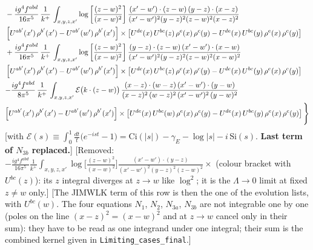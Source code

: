 \documentclass[9pt]{article}
\numberwithin{equation}{section}
\begin{document}
{\begin{align*}
& -\frac{ig^{4}f^{abd}}{16\pi^{5}}\,\frac{1}{k^{+}}\,\int_{x,y,z,x'}\log{\left[\frac{(z-w)^{2}}{(x-w)^{2}}\right]}\,
\frac{(x'-w')\cdot(z-w)\,(y-z)\cdot(x-z)}{(x'-w')^{2}(y-z)^{2}(z-w)^{2}(x-z)^{2}}\notag \\
&\left[U^{ab'}(x')\,\rho^{b'}(x')-U^{ab'}(w')\, \rho^{b'}(x')\right]\times \left[U^{de}(x)\,U^{bc}(z)\, \rho^{e}(x)\,\rho^{c}(y)-U^{de}(x)\,U^{bc}(y)\,\rho^{e}(x)\,\rho^{c}(y)\right] \notag \\
&+ \frac{ig^{4}f^{abd}}{16\pi^{5}}\,\frac{1}{k^{+}}\,\int_{x,y,z,x'}\log{\left[\frac{(z-w)^{2}}{(x-w)^{2}}\right]}\,
\frac{(y-z)\cdot(z-w)\,(x'-w')\cdot(x-w)}{(x'-w')^{2}(y-z)^{2}(z-w)^{2}(x-w)^{2}}\notag \\ 
& \left[U^{ab'}(x')\,\rho^{b'}(x')-U^{ab'}(w')\, \rho^{b'}(x')\right]\times \left[U^{de}(x)\,U^{bc}(z)\, \rho^{e}(x)\,\rho^{c}(y)-U^{de}(x)\,U^{bc}(y)\,\rho^{e}(x)\,\rho^{c}(y)\right]\notag \\ & {-\frac{ig^{4}f^{abd}}{8\pi^{5}}\,\frac{1}{k^{+}}\,\int_{x,y,z,x'}\mathcal{E}\big(k\cdot(z-w)\big)\,\frac{(x-z)\cdot(w-z)\,(x'-w')\cdot(y-w)}{(x-z)^{2}\,(w-z)^{2}\,(x'-w')^{2}\,(y-w)^{2}}}\notag \\ & {\left[U^{ab'}(x')\,\rho^{b'}(x')-U^{ab'}(w')\, \rho^{b'}(x')\right]\times \left[U^{de}(x)\,U^{bc}(w)\, \rho^{e}(x)\,\rho^{c}(y)-U^{de}(x)\,U^{bc}(y)\,\rho^{e}(x)\,\rho^{c}(y)\right]\Bigg\}}
\end{align*} {[with $\mathcal{E}(s)\equiv\int_{0}^{1}\frac{dt}{t}\big(e^{-ist}-1\big)=\mathrm{Ci}(|s|)-\gamma_{E}-\log|s|-i\,\mathrm{Si}(s)$. \textbf{Last term of $N_{3b}$ replaced.}]} {[Removed: $-\frac{ig^{4}f^{abd}}{16\pi^{5}}\frac{1}{k^{+}}\int_{x,y,z,x'}\log\big[\frac{(z-w)^{2}}{(x-w)^{2}}\big]\frac{(x'-w')\cdot(y-z)}{(x'-w')^{2}(y-z)^{2}(z-w)^{2}}\times$ (colour bracket with $U^{bc}(z)$): its $z$ integral diverges at $z\to w$ like $\log^{2}$; it is the $\Lambda\to0$ limit at fixed $z\neq w$ only.]} {[The JIMWLK term of this row is then the one of the evolution lists, with $U^{bc}(w)$. The four equations $N_{1}$, $N_{2}$, $N_{3a}$, $N_{3b}$ are not integrable one by one (poles on the line $(x-z)^{2}=(x-w)^{2}$ and at $z\to w$ cancel only in their sum): they have to be read as one integrand under one integral; their sum is the combined kernel given in \texttt{Limiting\_cases\_final}.]}\par\noindent
}\par
\end{document}
